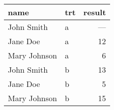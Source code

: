 \begin{tabular}{llr}
  \toprule
 name & trt & result \\ 
  \midrule
  John Smith & a & --- \\ 
  Jane Doe & a &  12 \\ 
  Mary Johnson & a &   6 \\ 
  John Smith & b &  13 \\ 
  Jane Doe & b &   5 \\ 
  Mary Johnson & b &  15 \\ 
   \bottomrule
\end{tabular}
